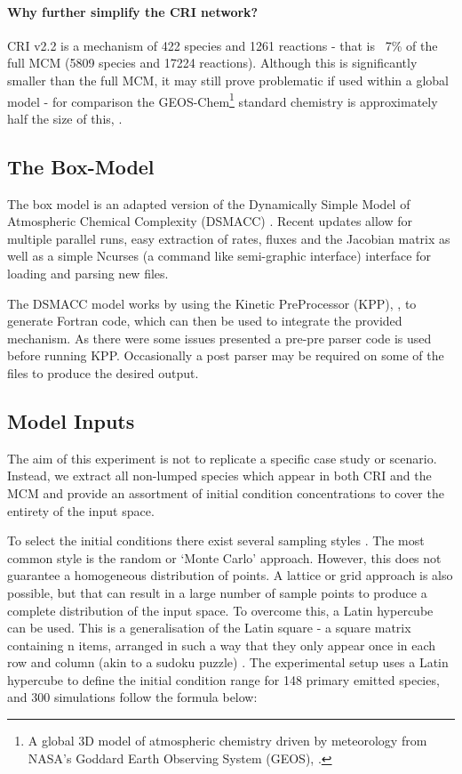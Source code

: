 \paragraph*{Why further simplify the CRI network?}\label{sec:whycri}
CRI v2.2 \citep{cri} is a mechanism of 422 species and 1261 reactions - that is ~7\% of the full MCM (5809 species and 17224 reactions). Although this is significantly smaller than the full MCM, it may still prove problematic if used within a global model - for comparison the GEOS-Chem\footnote{A global 3D model of atmospheric chemistry driven by meteorology from NASA's Goddard Earth Observing System (GEOS), \citep{geos}.} standard chemistry is approximately half the size of this, \citep{geosgit}.

\subsection{The Box-Model}
The box model is an adapted version of the Dynamically Simple Model of Atmospheric Chemical Complexity (DSMACC) \citep{dsmacc,dsmaccgit}. Recent updates allow for multiple parallel runs, easy extraction of rates, fluxes and the Jacobian matrix as well as a simple Ncurses (a command like semi-graphic interface) interface for loading and parsing new files.

The DSMACC model works by using the Kinetic PreProcessor (KPP), \citep{kpp}, to generate Fortran code, which can then be used to integrate the provided mechanism. As there were some issues presented a pre-pre parser code is used before running KPP. Occasionally a post parser may be required on some of the files to produce the desired output.

\subsection{Model Inputs}\label{sec:lumpinputs}
The aim of this experiment is not to replicate a specific case study or scenario. Instead, we extract all non-lumped species which appear in both CRI and the MCM and provide an assortment of initial condition concentrations to cover the entirety of the input space.

To select the initial conditions there exist several sampling styles \citep{sampling}. The most common style is the random or `Monte Carlo' approach. However, this does not guarantee a homogeneous distribution of points. A lattice or grid approach is also possible, but that can result in a large number of sample points to produce a complete distribution of the input space. To overcome this, a Latin hypercube can be used. This is a generalisation of the Latin square  -  a square matrix containing n items, arranged in such a way that they only appear once in each row and column (akin to a sudoku puzzle) \citep{lsq}. The experimental setup uses a Latin hypercube to define the initial condition range for 148 primary emitted species, and 300 simulations follow the formula below:

